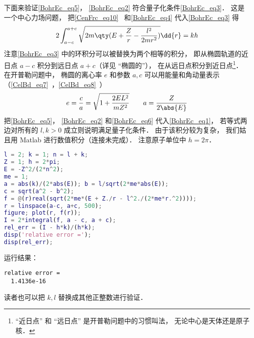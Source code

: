 下面来验证\autoref{BohrEc_eq5}， \autoref{BohrEc_eq2} 符合量子化条件\autoref{BohrEc_eq3}． 这是一个中心力场问题， 把\autoref{CenFrc_eq10}~ 和\autoref{BohrEc_eq4}  代入\autoref{BohrEc_eq3} 得
\begin{equation}\label{BohrEc_eq1}
2\int_{a-c}^{a+c} \sqrt{2m\qty(E + \frac{Z}{r} - \frac{l^2}{2mr^2})} \dd{r} = kh
\end{equation}
注意\autoref{BohrEc_eq3} 中的环积分可以被替换为两个相等的积分， 即从椭圆轨道的近日点 $a-c$ 积分到远日点 $a+c$（详见 “椭圆的”）， 在从远日点积分到近日点\footnote{“近日点” 和 “远日点” 是开普勒问题中的习惯叫法， 无论中心是天体还是原子核．}． 在开普勒问题中， 椭圆的离心率 $e$ 和参数 $a, c$ 可以用能量和角动量表示（\autoref{CelBd_eq7}~，\autoref{CelBd_eq8}~）
\begin{equation}\label{BohrEc_eq6}
e = \frac{c}{a} = \sqrt{1 + \frac{2EL^2}{mZ^2}}
\qquad
a = \frac{Z}{2\abs{E}}
\end{equation}
把\autoref{BohrEc_eq5}， \autoref{BohrEc_eq2} 和\autoref{BohrEc_eq6} 代入\autoref{BohrEc_eq1}， 若等式两边对所有的 $l,k > 0$ 成立则说明满足量子化条件． 由于该积分较为复杂， 我们姑且用 Matlab 进行数值积分（连接未完成）． 注意原子单位中 $h = 2\pi$．
\begin{lstlisting}[language=matlab]
l = 2; k = 1; n = l + k;
Z = 1; h = 2*pi;
E = -Z^2/(2*n^2);
me = 1;
a = abs(k)/(2*abs(E)); b = l/sqrt(2*me*abs(E));
c = sqrt(a^2 - b^2);
f = @(r)real(sqrt(2*me*(E + Z./r - l^2./(2*me*r.^2))));
r = linspace(a-c, a+c, 500);
figure; plot(r, f(r));
I = 2*integral(f, a - c, a + c);
rel_err = (I - h*k)/(h*k);
disp('relative error =');
disp(rel_err);
\end{lstlisting}
运行结果： 
\begin{lstlisting}[language=matlabC]
relative error =
  1.4136e-16
\end{lstlisting}
读者也可以把 $k, l$ 替换成其他正整数进行验证．

